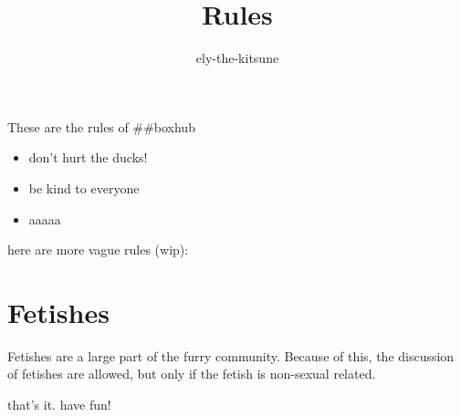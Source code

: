 \title {Rules}
\author {ely-the-kitsune}


  These are the rules of \#\#boxhub
  \begin{itemize}
    \item don't hurt the ducks!
    \item be kind to everyone
    \item aaaaa
  \end{itemize}
  here are more vague rules (wip):
  \chapter{Fetishes}
  Fetishes are a large part of the furry community. Because of this, the discussion of fetishes are allowed, but only if the fetish is non-sexual related.

  that's it. have fun!

